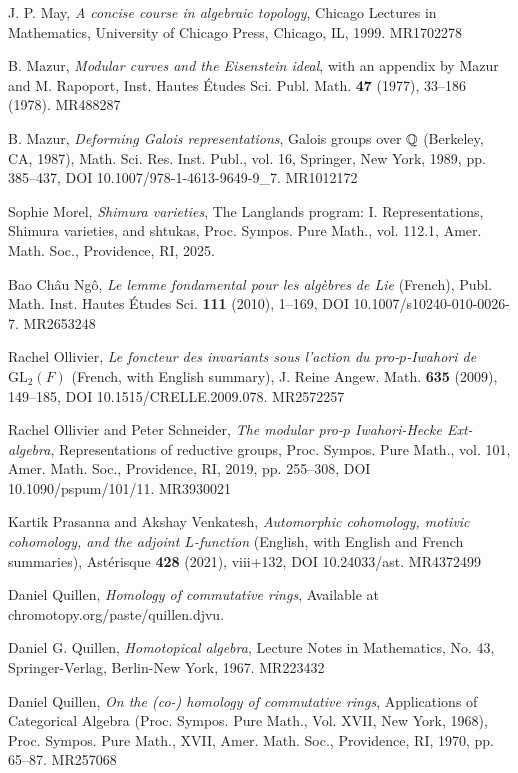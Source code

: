 \begin{refs}
\item[{[May99]}] J. P. May, \emph{A concise course in algebraic topology}, Chicago Lectures in Mathematics, University of Chicago Press, Chicago, IL, 1999. MR1702278
\item[{[Maz77]}] B. Mazur, \emph{Modular curves and the Eisenstein ideal}, with an appendix by Mazur and M. Rapoport, Inst. Hautes \'Etudes Sci. Publ. Math. \textbf{47} (1977), 33--186 (1978). MR488287
\item[{[Maz89]}] B. Mazur, \emph{Deforming Galois representations}, Galois groups over $\mathbb{Q}$ (Berkeley, CA, 1987), Math. Sci. Res. Inst. Publ., vol. 16, Springer, New York, 1989, pp. 385--437, DOI 10.1007/978-1-4613-9649-9\_7. MR1012172
\item[{[Mor25]}] Sophie Morel, \emph{Shimura varieties}, The Langlands program: I. Representations, Shimura varieties, and shtukas, Proc. Sympos. Pure Math., vol. 112.1, Amer. Math. Soc., Providence, RI, 2025.
\item[{[Ngo10]}] Bao Ch\^au Ng\^o, \emph{Le lemme fondamental pour les alg\`ebres de Lie} (French), Publ. Math. Inst. Hautes \'Etudes Sci. \textbf{111} (2010), 1--169, DOI 10.1007/s10240-010-0026-7. MR2653248
\item[{[Oll09]}] Rachel Ollivier, \emph{Le foncteur des invariants sous l'action du pro-$p$-Iwahori de $\mathrm{GL}_2(F)$} (French, with English summary), J. Reine Angew. Math. \textbf{635} (2009), 149--185, DOI 10.1515/CRELLE.2009.078. MR2572257
\item[{[OS19]}] Rachel Ollivier and Peter Schneider, \emph{The modular pro-$p$ Iwahori-Hecke Ext-algebra}, Representations of reductive groups, Proc. Sympos. Pure Math., vol. 101, Amer. Math. Soc., Providence, RI, 2019, pp. 255--308, DOI 10.1090/pspum/101/11. MR3930021
\item[{[PV21]}] Kartik Prasanna and Akshay Venkatesh, \emph{Automorphic cohomology, motivic cohomology, and the adjoint $L$-function} (English, with English and French summaries), Ast\'erisque \textbf{428} (2021), viii+132, DOI 10.24033/ast. MR4372499
\item[{[Qui]}] Daniel Quillen, \emph{Homology of commutative rings}, Available at chromotopy.org/paste/quillen.djvu.
\item[{[Qui67]}] Daniel G. Quillen, \emph{Homotopical algebra}, Lecture Notes in Mathematics, No. 43, Springer-Verlag, Berlin-New York, 1967. MR223432
\item[{[Qui70]}] Daniel Quillen, \emph{On the (co-) homology of commutative rings}, Applications of Categorical Algebra (Proc. Sympos. Pure Math., Vol. XVII, New York, 1968), Proc. Sympos. Pure Math., XVII, Amer. Math. Soc., Providence, RI, 1970, pp. 65--87. MR257068

\end{refs}
